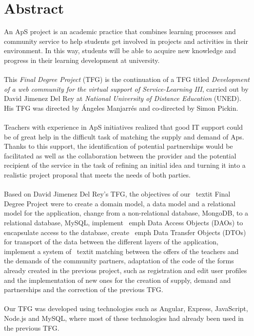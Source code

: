 \documentclass[11pt]{book}
\begin{document}
\chapter*{Abstract} 
An ApS project is an academic practice that combines learning processes and community service to help students get involved in projects and activities in their environment. In this way, students will be able to acquire new knowledge and progress in their learning development at university. \\\\
This \textit{Final Degree Project} (TFG) is the continuation of a TFG titled \textit{Development of a web community for the virtual support of Service-Learning III}, carried out by David Jimenez Del Rey at \emph{National University of Distance Education} (UNED). His TFG was directed by Ángeles Manjarrés and co-directed by Simon Pickin. \\\\
Teachers with experience in ApS initiatives realized that good IT support could be of great help in the difficult task of matching the supply and demand of Aps. Thanks to this support, the identification of potential partnerships would be facilitated as well as the collaboration between the provider and the potential recipient of the service in the task of refining an initial idea and turning it into a realistic project proposal that meets the needs of both parties. \\\\
Based on David Jimenez Del Rey's TFG, the objectives of our \ textit {Final Degree Project} were to create a domain model, a data model and a relational model for the application, change from a non-relational database, MongoDB, to a relational database, MySQL, implement \ emph {Data Access Objects} (DAOs) to encapsulate access to the database, create \ emph {Data Transfer Objects} (DTOs) for transport of the data between the different layers of the application, implement a system of \ textit {matching} between the offers of the teachers and the demands of the community partners, adaptation of the code of the forms already created in the previous project, such as registration and edit user profiles and the implementation of new ones for the creation of supply, demand and partnerships and the correction of the previous TFG. \\\\
Our TFG was developed using technologies such as Angular, Express, JavaScript, Node.js and MySQL, where most of these technologies had already been used in the previous TFG.\\\\
\end{document}
